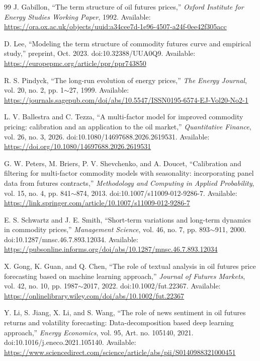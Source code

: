 \documentclass[journal]{IEEEtran}
\newcommand{\rng}{\ensuremath{\sim}}
\begin{document}
\begin{thebibliography}{99}
J. Gabillon, ``The term structure of oil futures prices,'' \textit{Oxford Institute for Energy Studies Working Paper}, 1992. Available: \url{https://ora.ox.ac.uk/objects/uuid:a34cee7d-1e96-4507-a24f-0ee42f305acc}

D. Lee, ``Modeling the term structure of commodity futures curve and empirical study,'' preprint, Oct. 2023. doi:10.32388/UUA0Q9. Available: \url{https://europepmc.org/article/ppr/ppr743850}

R. S. Pindyck, ``The long-run evolution of energy prices,'' \textit{The Energy Journal}, vol. 20, no. 2, pp. 1\rng{}27, 1999. Available: \url{https://journals.sagepub.com/doi/abs/10.5547/ISSN0195-6574-EJ-Vol20-No2-1}

L. V. Ballestra and C. Tezza, ``A multi-factor model for improved commodity pricing: calibration and an application to the oil market,'' \textit{Quantitative Finance}, vol. 26, no. 3, 2026. doi:10.1080/14697688.2026.2619531. Available: \url{https://doi.org/10.1080/14697688.2026.2619531}

G. W. Peters, M. Briers, P. V. Shevchenko, and A. Doucet, ``Calibration and filtering for multi-factor commodity models with seasonality: incorporating panel data from futures contracts,'' \textit{Methodology and Computing in Applied Probability}, vol. 15, no. 4, pp. 841\rng{}874, 2013. doi:10.1007/s11009-012-9286-7. Available: \url{https://link.springer.com/article/10.1007/s11009-012-9286-7}

E. S. Schwartz and J. E. Smith, ``Short-term variations and long-term dynamics in commodity prices,'' \textit{Management Science}, vol. 46, no. 7, pp. 893\rng{}911, 2000. doi:10.1287/mnsc.46.7.893.12034. Available: \url{https://pubsonline.informs.org/doi/abs/10.1287/mnsc.46.7.893.12034}

X. Gong, K. Guan, and Q. Chen, ``The role of textual analysis in oil futures price forecasting based on machine learning approach,'' \textit{Journal of Futures Markets}, vol. 42, no. 10, pp. 1987\rng{}2017, 2022. doi:10.1002/fut.22367. Available: \url{https://onlinelibrary.wiley.com/doi/abs/10.1002/fut.22367}

Y. Li, S. Jiang, X. Li, and S. Wang, ``The role of news sentiment in oil futures returns and volatility forecasting: Data-decomposition based deep learning approach,'' \textit{Energy Economics}, vol. 95, Art. no. 105140, 2021. doi:10.1016/j.eneco.2021.105140. Available: \url{https://www.sciencedirect.com/science/article/abs/pii/S0140988321000451}


\end{thebibliography}
\end{document}
